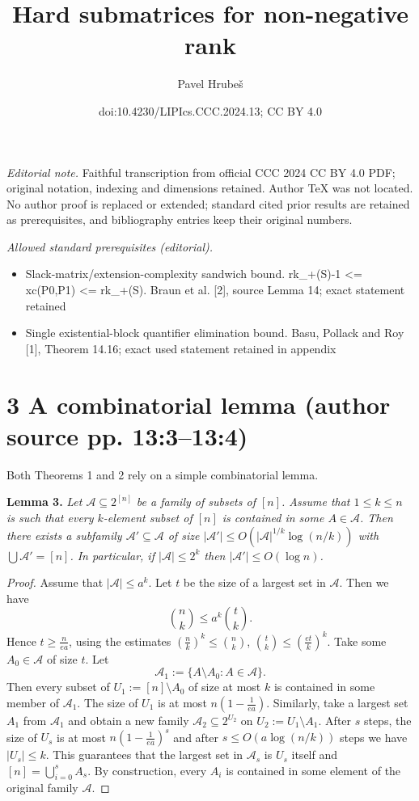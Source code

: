 \documentclass[10pt,a4paper]{article}
\title{Hard submatrices for non-negative rank}
\author{Pavel Hrubeš}
\date{doi:10.4230/LIPIcs.CCC.2024.13; CC BY 4.0}
\newenvironment{originalresult}[1]{\par\medskip\noindent\textbf{#1.}\itshape}{\par\medskip}
\begin{document}
\maketitle
\noindent\textit{Editorial note.} Faithful transcription from official CCC 2024 CC BY 4.0 PDF; original notation, indexing and dimensions retained. Author TeX was not located. No author proof is replaced or extended; standard cited prior results are retained as prerequisites, and bibliography entries keep their original numbers.\par\medskip
\noindent\textit{Allowed standard prerequisites (editorial).}\begin{itemize}
\item Slack-matrix/extension-complexity sandwich bound. rk\_+(S)-1 <= xc(P0,P1) <= rk\_+(S). Braun et al. [2], source Lemma 14; exact statement retained
\item Single existential-block quantifier elimination bound. Basu, Pollack and Roy [1], Theorem 14.16; exact used statement retained in appendix
\end{itemize}\medskip
\section*{3 A combinatorial lemma (author source pp. 13:3--13:4)}
Both Theorems 1 and 2 rely on a simple combinatorial lemma.
\begin{originalresult}{Lemma 3}
Let $\mathcal A\subseteq 2^{[n]}$ be a family of subsets of $[n]$. Assume that $1\le k\le n$ is such that every $k$-element subset of $[n]$ is contained in some $A\in\mathcal A$. Then there exists a subfamily $\mathcal A'\subseteq\mathcal A$ of size $|\mathcal A'|\le O(|\mathcal A|^{1/k}\log(n/k))$ with $\bigcup\mathcal A'=[n]$. In particular, if $|\mathcal A|\le 2^k$ then $|\mathcal A'|\le O(\log n)$.
\end{originalresult}
\begin{proof}
Assume that $|\mathcal A|\le a^k$. Let $t$ be the size of a largest set in $\mathcal A$. Then we have
\[\binom nk\le a^k\binom tk.\]
Hence $t\ge\frac n{ea}$, using the estimates $(\frac nk)^k\le\binom nk$, $\binom tk\le(\frac{et}k)^k$. Take some $A_0\in\mathcal A$ of size $t$. Let
\[\mathcal A_1:=\{A\setminus A_0:A\in\mathcal A\}.\]
Then every subset of $U_1:=[n]\setminus A_0$ of size at most $k$ is contained in some member of $\mathcal A_1$. The size of $U_1$ is at most $n(1-\frac1{ea})$. Similarly, take a largest set $A_1$ from $\mathcal A_1$ and obtain a new family $\mathcal A_2\subseteq 2^{U_2}$ on $U_2:=U_1\setminus A_1$. After $s$ steps, the size of $U_s$ is at most $n(1-\frac1{ea})^s$ and after $s\le O(a\log(n/k))$ steps we have $|U_s|\le k$. This guarantees that the largest set in $\mathcal A_s$ is $U_s$ itself and $[n]=\bigcup_{i=0}^s A_s$. By construction, every $A_i$ is contained in some element of the original family $\mathcal A$.
\end{proof}
\end{document}
